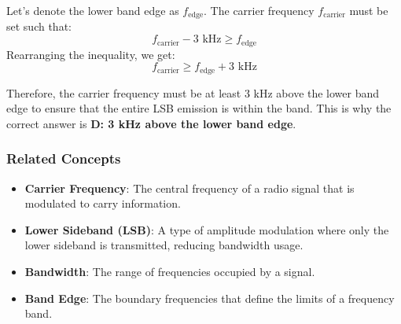 Let’s denote the lower band edge as \( f_{\text{edge}} \). The carrier frequency \( f_{\text{carrier}} \) must be set such that:
\[ f_{\text{carrier}} - 3 \text{ kHz} \geq f_{\text{edge}} \]
Rearranging the inequality, we get:
\[ f_{\text{carrier}} \geq f_{\text{edge}} + 3 \text{ kHz} \]

Therefore, the carrier frequency must be at least 3 kHz above the lower band edge to ensure that the entire LSB emission is within the band. This is why the correct answer is \textbf{D: 3 kHz above the lower band edge}.

\subsubsection{Related Concepts}
\begin{itemize}
    \item \textbf{Carrier Frequency}: The central frequency of a radio signal that is modulated to carry information.
    \item \textbf{Lower Sideband (LSB)}: A type of amplitude modulation where only the lower sideband is transmitted, reducing bandwidth usage.
    \item \textbf{Bandwidth}: The range of frequencies occupied by a signal.
    \item \textbf{Band Edge}: The boundary frequencies that define the limits of a frequency band.
\end{itemize}

